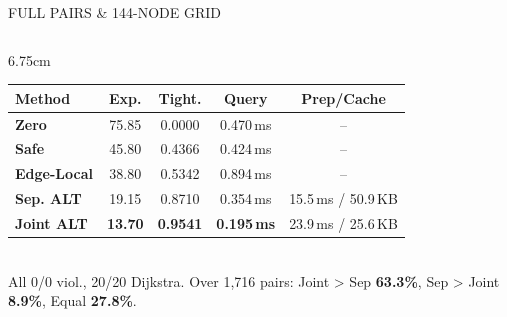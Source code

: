 \documentclass[aspectratio=169,10pt]{beamer}
\begin{document}
\begin{frame}{FULL PAIRS \& 144-NODE GRID}
\begin{columns}[T,onlytextwidth]
\begin{column}{6.75cm}
{      \fontsize{7.0}{8.4}\selectfont
      \begin{tabular}{@{}>{\bfseries\color{NavIvory}}lcccc@{}}
        \toprule
        \textbf{\color{NavMuted}Method} & \textbf{\color{NavMuted}Exp.} & \textbf{\color{NavMuted}Tight.} & \textbf{\color{NavMuted}Query} & \textbf{\color{NavMuted}Prep/Cache} \\
        \midrule
        Zero & 75.85 & 0.0000 & 0.470\,ms & -- \\
        Safe & 45.80 & 0.4366 & 0.424\,ms & -- \\
        Edge-Local & 38.80 & 0.5342 & 0.894\,ms & -- \\
        Sep. ALT & 19.15 & 0.8710 & 0.354\,ms & 15.5\,ms / 50.9\,KB \\
        Joint ALT & \color{NavViolet}\textbf{13.70} & \color{NavViolet}\textbf{0.9541} & \color{NavTeal}\textbf{0.195\,ms} & 23.9\,ms / 25.6\,KB \\
        \bottomrule
      \end{tabular}\\[4pt]
      {\fontsize{7.1}{9.2}\selectfont\color{NavMuted}All 0/0 viol., 20/20 Dijkstra. Over 1,716 pairs: Joint > Sep \textbf{63.3\%}, Sep > Joint \textbf{8.9\%}, Equal \textbf{27.8\%}.}%
    }
  \end{column}
\end{columns}
\end{frame}
\end{document}
